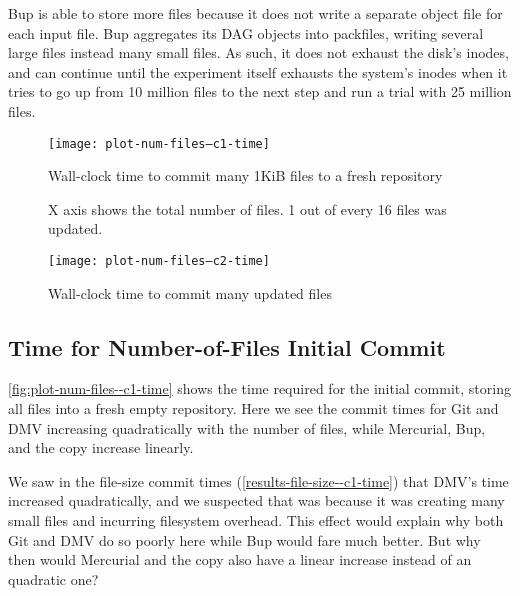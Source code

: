 Bup is able to store more files because it does not write a separate object file
for each input file. Bup aggregates its DAG objects into \glspl{packfile},
writing several large files instead many small files. As such, it does not
exhaust the disk's \glspl{inode}, and can continue until the experiment itself
exhausts the system's \glspl{inode} when it tries to go up from \num{10} million
files to the next step and run a trial with \num{25} million files.

%

\begin{figure}[p]
    \begin{leftfullpage}
        \caption{Wall-clock time to commit many 1KiB files to a fresh repository}
        \label{fig:plot-num-files--c1-time}
        \centering

        \explainlogsubfig

        \texttt{[image: plot-num-files--c1-time]}
    \end{leftfullpage}
\end{figure}

\begin{figure}[p]
    \begin{leftfullpage}
        \caption{Wall-clock time to commit many updated files}
        \label{fig:plot-num-files--c2-time}
        \centering

        X axis shows the total number of files. 1 out of every 16 files was updated.
        \explainlogsubfig

        \texttt{[image: plot-num-files--c2-time]}
    \end{leftfullpage}
\end{figure}

\cleardoublepage

\subsection{Time for Number-of-Files Initial Commit}
\label{results-num-files--c1-time}

\autoref{fig:plot-num-files--c1-time} shows the time required for the initial
\gls{commit}, storing all files into a fresh empty \gls{repository}. Here we see
the commit times for Git and DMV increasing quadratically with the number of
files, while Mercurial, Bup, and the copy increase linearly.

We saw in the file-size commit times (\autoref{results-file-size--c1-time}) that
DMV's time increased quadratically, and we suspected that was because it was
creating many small files and incurring filesystem overhead. This effect would
explain why both Git and DMV do so poorly here while Bup would fare much better.
But why then would Mercurial and the copy also have a linear increase instead of
an quadratic one?

